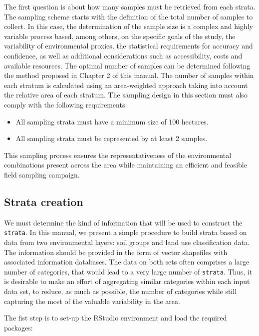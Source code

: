 \documentclass[
]{book}
\providecommand{\tightlist}{%
  \setlength{\itemsep}{0pt}\setlength{\parskip}{0pt}}
\begin{document}
The first question is about how many samples must be retrieved from each strata. The sampling scheme starts with the definition of the total number of samples to collect. In this case, the determination of the sample size is a complex and highly variable process based, among others, on the specific goals of the study, the variability of environmental proxies, the statistical requirements for accuracy and confidence, as well as additional considerations such as accessibility, costs and available resources. The optimal number of samples can be determined following the method proposed in Chapter 2 of this manual. The number of samples within each stratum is calculated using an area-weighted approach taking into account the relative area of each stratum. The sampling design in this section must also comply with the following requirements:

\begin{itemize}
\tightlist
\item
  All sampling strata must have a minimum size of 100 hectares.
\item
  All sampling strata must be represented by at least 2 samples.
\end{itemize}

This sampling process ensures the representativeness of the environmental combinations present across the area while maintaining an efficient and feasible field sampling campaign.

\hypertarget{strata-creation}{%
\subsection{Strata creation}\label{strata-creation}}

We must determine the kind of information that will be used to construct the \texttt{strata}. In this manual, we present a simple procedure to build strata based on data from two environmental layers: soil groups and land use classification data. The information should be provided in the form of vector shapefiles with associated information databases. The data on both sets often comprises a large number of categories, that would lead to a very large number of \texttt{strata}. Thus, it is desirable to make an effort of aggregating similar categories within each input data set, to reduce, as much as possible, the number of categories while still capturing the most of the valuable variability in the area.

The fist step is to set-up the RStudio environment and load the required packages:
\end{document}

